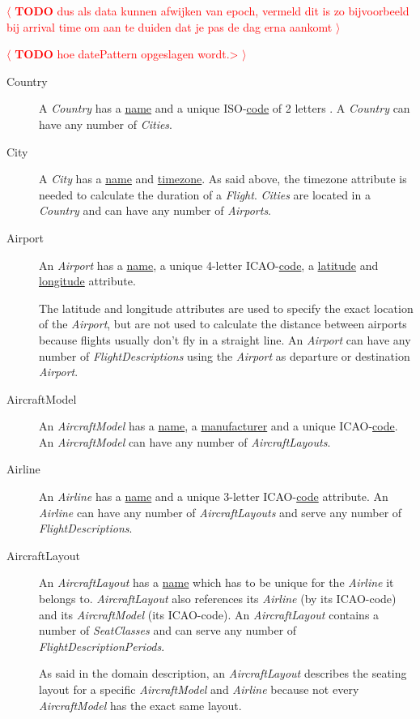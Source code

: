 \documentclass[a4paper,11pt]{article}
\newcommand{\npar}{\par \vspace{2.3ex plus 0.3ex minus 0.3ex} \noindent}
\newcommand{\spar}{\par \noindent}
\newcommand{\dsltype}[1]{\textit{#1}}
\newcommand{\dslattr}[1]{\uline{#1}}
\newcommand{\todo}[1]{\textcolor{red}{\(\langle\) \textbf{TODO} #1 \(\rangle\) }}
\begin{document}
\todo{dus als data kunnen afwijken van epoch, vermeld
dit is zo bijvoorbeeld bij arrival time om aan te duiden dat je pas de dag erna aankomt}
\spar\todo{hoe datePattern opgeslagen wordt.>}

\begin{description}
\item[Country]
A \dsltype{Country} has a \dslattr{name} and a unique ISO-\dslattr{code} of 2 letters \citep{iso_country}. A \dsltype{Country} can have any number of \dsltype{Cities}.

\item[City]
A \dsltype{City} has a \dslattr{name} and \dslattr{timezone}. As said above, the timezone attribute is needed to calculate the duration of a \dsltype{Flight}. \dsltype{Cities} are located in a \dsltype{Country} and can have any number of \dsltype{Airports}.

\item[Airport]
An \dsltype{Airport} has a \dslattr{name}, a unique 4-letter ICAO-\dslattr{code}, a \dslattr{latitude} and \dslattr{longitude} attribute.
\spar The latitude and longitude attributes are used to specify the exact location of the \dsltype{Airport}, but are not used to calculate the distance between airports because flights usually don’t fly in a straight line. An \dsltype{Airport} can have any number of \dsltype{FlightDescriptions} using the \dsltype{Airport} as departure or destination \dsltype{Airport}.

\item[AircraftModel]
An \dsltype{AircraftModel} has a \dslattr{name}, a \dslattr{manufacturer} and a unique ICAO-\dslattr{code}. An \dsltype{AircraftModel} can have any number of \dsltype{AircraftLayouts}.

\item[Airline]
An \dsltype{Airline} has a \dslattr{name} and a unique 3-letter ICAO-\dslattr{code} attribute. An \dsltype{Airline} can have any number of \dsltype{AircraftLayouts} and serve any number of \dsltype{FlightDescriptions}. 

\item[AircraftLayout]
An \dsltype{AircraftLayout} has a \dslattr{name} which has to be unique for the \dsltype{Airline} it belongs to. \dsltype{AircraftLayout} also references its \dsltype{Airline} (by its ICAO-code) and its \dsltype{AircraftModel} (its ICAO-code). An \dsltype{AircraftLayout} contains a number of \dsltype{SeatClasses} and can serve any number of \dsltype{FlightDescriptionPeriods}.

\npar As said in the domain description, an \dsltype{AircraftLayout} describes the seating layout for a specific \dsltype{AircraftModel} and \dsltype{Airline} because not every \dsltype{AircraftModel} has the exact same layout.


\end{description}
\end{document}
